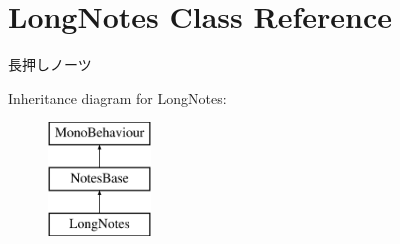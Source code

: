 \hypertarget{class_long_notes}{}\section{Long\+Notes Class Reference}
\label{class_long_notes}


長押しノーツ  


Inheritance diagram for Long\+Notes\+:\begin{figure}[H]
\begin{center}
\leavevmode
\includegraphics[height=3.000000cm]{class_long_notes}
\end{center}
\end{figure}

